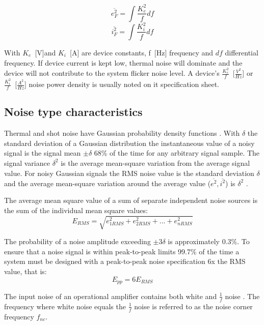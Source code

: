 \begin{itemize}
	\begin{equation}
		\overline{e_F^2} = \int{\frac{K_e^2}{f}df}
	\end{equation}
	\begin{equation}
		\overline{i_F^2} = \int{\frac{K_i^2}{f}df}
	\end{equation}


	With $K_e$~[V]and $K_i$~[A] are device constants, f~[Hz] frequency
	and $df$ differential frequency. If device current is kept low,
	thermal noise will dominate and the device will not contribute to
	the system flicker noise level. A device's
	$\frac{K_e^2}{f}$~[$\frac{V^2}{Hz}$] or
	$\frac{K_i^2}{f}$~[$\frac{A^2}{Hz}$] noise power density is
	usually noted on it specification sheet.	
\end{itemize}


\subsection{Noise type characteristics}
Thermal and shot noise have Gaussian probability density functions
\cite[p4]{noise-analysis}. With $\delta$ the standard deviation 
of a Gaussian distribution the instantaneous value of a noisy signal is
the signal mean $\pm\delta$ 68\% of the time for any arbitrary signal
sample. The signal variance $\delta^2$ is the average mean-square
variation from the average signal value. For noisy Gaussian signals the
RMS noise value is the standard deviation $\delta$ and the average
mean-square variation around the average value ($\overline{e^2},
\overline{i^2}$) is $\delta^2$ \cite[p4]{noise-analysis}.


The average mean square value of a sum of separate independent noise
sources is the sum of the individual mean square values:
\begin{equation}
	E_{RMS} = \sqrt{e_{1RMS}^2 + e_{2RMS}^2 + ... +e_{nRMS}^2}
	\label{eq:noise-rms}
\end{equation}

The probability of a noise amplitude exceeding $\pm$3$\delta$ is
approximately 0.3\%. To ensure that a noise signal is within
peak-to-peak limits 99.7\% of the time a system must be designed with a
peak-to-peak noise specification 6x the RMS value, that is:
\begin{equation}
	E_{pp} = 6E_{RMS}
	\label{eq:noise-pp}
\end{equation}

The input noise of an operational amplifier contains both white and
$\frac{1}{f}$ noise \cite[p7]{noise-analysis}. The frequency where
white noise equals the $\frac{1}{f}$ noise is referred to as the noise
corner frequency $f_{nc}$.

